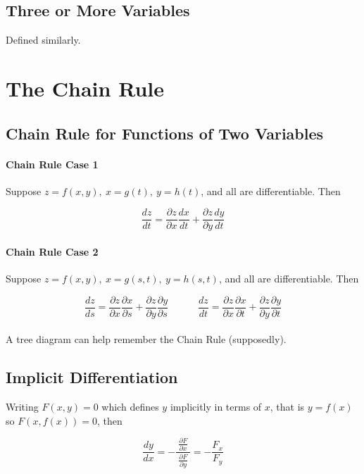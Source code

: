 \documentclass{report}  %
\begin{document}
\subsection*{Three or More Variables}
Defined similarly.

\newpage

\section{The Chain Rule}
\subsection*{Chain Rule for Functions of Two Variables}
\paragraph{Chain Rule Case 1} Suppose $z = f(x, y), \ x = g(t), \ y = h(t)$, and all are differentiable. Then

\begin{equation}
	\frac{dz}{dt} = \frac{\partial z}{\partial x} \frac{dx}{dt} + \frac{\partial z}{\partial y} \frac{dy}{dt}
\end{equation}

\paragraph{Chain Rule Case 2} Suppose $z = f(x, y), \ x = g(s, t), \ y = h(s, t)$, and all are differentiable. Then

\begin{equation}
	\frac{dz}{ds} = \frac{\partial z}{\partial x} \frac{\partial x}{ \partial s} + \frac{\partial z}{\partial y} \frac{\partial y}{\partial s}
	\qquad \quad
	\frac{dz}{dt} = \frac{\partial z}{\partial x} \frac{\partial x}{ \partial t} + \frac{\partial z}{\partial y} \frac{\partial y}{\partial t}
\end{equation}
\\

A tree diagram can help remember the Chain Rule (supposedly). 

\subsection*{Implicit Differentiation}
Writing $F(x, y) = 0$ which defines $y$ implicitly in terms of $x$, that is $y = f(x)$ so $F(x, f(x)) = 0$, then 

\begin{equation}
	\frac{dy}{dx} = - \displaystyle \frac{\displaystyle  \ \frac{\partial F}{\partial x } \ }{\displaystyle \frac{\partial F}{\partial y}}
	= - \frac{F_x}{F_y}
\end{equation} \\
\end{document}

